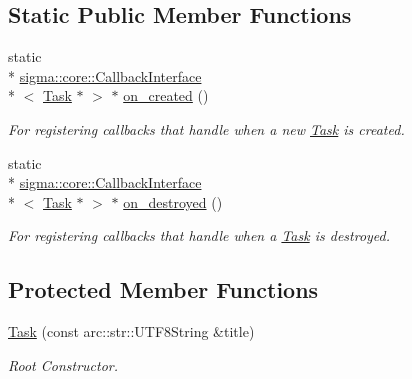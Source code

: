 \subsection*{Static Public Member Functions}
\begin{DoxyCompactItemize}
\item 
static \\*
\hyperlink{classsigma_1_1core_1_1_callback_interface}{sigma\-::core\-::\-Callback\-Interface}\\*
$<$ \hyperlink{classsigma_1_1core_1_1tasks_1_1_task}{Task} $\ast$ $>$ $\ast$ \hyperlink{classsigma_1_1core_1_1tasks_1_1_task_ab5adda36bbe6b20916f582ffeb311a13}{on\-\_\-created} ()
\begin{DoxyCompactList}\small\item\em For registering callbacks that handle when a new \hyperlink{classsigma_1_1core_1_1tasks_1_1_task}{Task} is created. \end{DoxyCompactList}\item 
static \\*
\hyperlink{classsigma_1_1core_1_1_callback_interface}{sigma\-::core\-::\-Callback\-Interface}\\*
$<$ \hyperlink{classsigma_1_1core_1_1tasks_1_1_task}{Task} $\ast$ $>$ $\ast$ \hyperlink{classsigma_1_1core_1_1tasks_1_1_task_a720571d12a0e2b41c918f448f5fc81db}{on\-\_\-destroyed} ()
\begin{DoxyCompactList}\small\item\em For registering callbacks that handle when a \hyperlink{classsigma_1_1core_1_1tasks_1_1_task}{Task} is destroyed. \end{DoxyCompactList}\end{DoxyCompactItemize}
\subsection*{Protected Member Functions}
\begin{DoxyCompactItemize}
\item 
\hyperlink{classsigma_1_1core_1_1tasks_1_1_task_af80640d4e44b03d9961b895229a9556d}{Task} (const arc\-::str\-::\-U\-T\-F8\-String \&title)
\begin{DoxyCompactList}\small\item\em Root Constructor. \end{DoxyCompactList}\end{DoxyCompactItemize}
